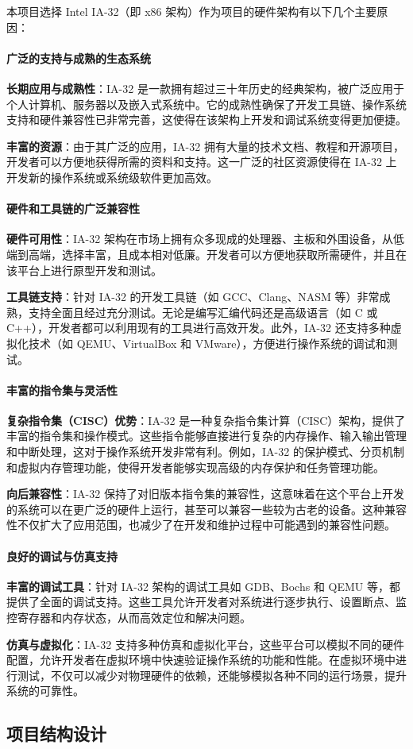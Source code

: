 本项目选择 Intel IA-32（即 x86 架构）作为项目的硬件架构有以下几个主要原因：

\paragraph{广泛的支持与成熟的生态系统}

\textbf{长期应用与成熟性}：IA-32 是一款拥有超过三十年历史的经典架构，被广泛应用于个人计算机、服务器以及嵌入式系统中。它的成熟性确保了开发工具链、操作系统支持和硬件兼容性已非常完善，这使得在该架构上开发和调试系统变得更加便捷。

\textbf{丰富的资源}：由于其广泛的应用，IA-32 拥有大量的技术文档、教程和开源项目，开发者可以方便地获得所需的资料和支持。这一广泛的社区资源使得在 IA-32 上开发新的操作系统或系统级软件更加高效。

\paragraph{硬件和工具链的广泛兼容性}

\textbf{硬件可用性}：IA-32 架构在市场上拥有众多现成的处理器、主板和外围设备，从低端到高端，选择丰富，且成本相对低廉。开发者可以方便地获取所需硬件，并且在该平台上进行原型开发和测试。

\textbf{工具链支持}：针对 IA-32 的开发工具链（如 GCC、Clang、NASM 等）非常成熟，支持全面且经过充分测试。无论是编写汇编代码还是高级语言（如 C 或 C++），开发者都可以利用现有的工具进行高效开发。此外，IA-32 还支持多种虚拟化技术（如 QEMU、VirtualBox 和 VMware），方便进行操作系统的调试和测试。

\paragraph{丰富的指令集与灵活性}

\textbf{复杂指令集（CISC）优势}：IA-32 是一种复杂指令集计算（CISC）架构，提供了丰富的指令集和操作模式。这些指令能够直接进行复杂的内存操作、输入输出管理和中断处理，这对于操作系统开发非常有利。例如，IA-32 的保护模式、分页机制和虚拟内存管理功能，使得开发者能够实现高级的内存保护和任务管理功能。

\textbf{向后兼容性}：IA-32 保持了对旧版本指令集的兼容性，这意味着在这个平台上开发的系统可以在更广泛的硬件上运行，甚至可以兼容一些较为古老的设备。这种兼容性不仅扩大了应用范围，也减少了在开发和维护过程中可能遇到的兼容性问题。

\paragraph{良好的调试与仿真支持}

\textbf{丰富的调试工具}：针对 IA-32 架构的调试工具如 GDB、Bochs 和 QEMU 等，都提供了全面的调试支持。这些工具允许开发者对系统进行逐步执行、设置断点、监控寄存器和内存状态，从而高效定位和解决问题。

\textbf{仿真与虚拟化}：IA-32 支持多种仿真和虚拟化平台，这些平台可以模拟不同的硬件配置，允许开发者在虚拟环境中快速验证操作系统的功能和性能。在虚拟环境中进行测试，不仅可以减少对物理硬件的依赖，还能够模拟各种不同的运行场景，提升系统的可靠性。

\subsection{项目结构设计}